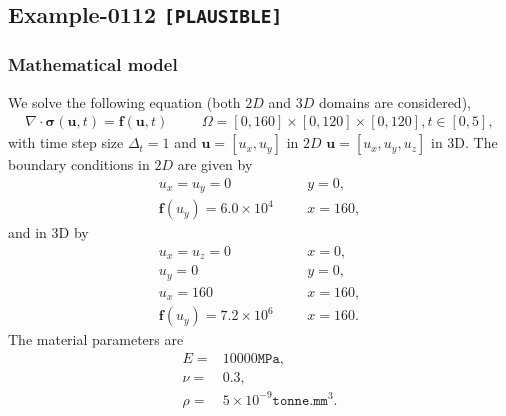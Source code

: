 %
\clearpage
%
\subsection{Example-0112 \texttt{[PLAUSIBLE]}}
%
%
\subsubsection{Mathematical model}
%
We solve the following equation (both $2D$ and $3D$ domains are considered),
%
\begin{align}
    \nabla \cdot \boldsymbol{\sigma} (\boldsymbol{u}, t) = \boldsymbol{f} (\boldsymbol{u}, t) & &&\Omega = [0, 160] \times [0, 120] \times [0, 120], t \in [0, 5],
\end{align}
%
with time step size $\Delta_t = 1$ and $\boldsymbol{u} = [u_x,u_y]$ in $2D$ $\boldsymbol{u} = [u_x,u_y,u_z]$ in 3D. The boundary conditions in $2D$ are given by
%
\begin{align}
    u_x = u_y = 0 & &&y = 0, \\
		\boldsymbol{f} (u_y) = 6.0 \times 10^{4} & &&x = 160,
\end{align}
%
and in 3D by
\begin{align}
    u_x = u_z = 0 & &&x = 0, \\
    u_y = 0 & &&y = 0, \\
		u_x = 160 & &&x = 160, \\
		\boldsymbol{f} (u_y) = 7.2 \times 10^{6} & &&x = 160.
\end{align}
The material parameters are
\begin{align}
    E = & 10000\texttt{MPa}, \\
    \nu = & 0.3, \\
		\rho = & 5 \times 10^{-9}\texttt{tonne.mm$^3$}.
\end{align}
%
%
